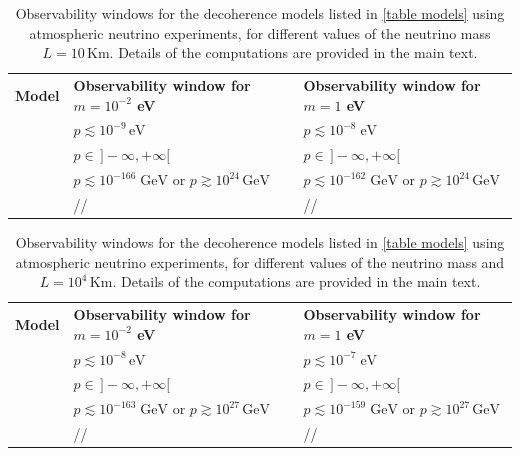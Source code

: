 \documentclass[11pt]{article}
\begin{document}
\begin{table}
    \centering
{\tabulinesep=1.2mm
        \begin{tabu}{|l|l|l|}
       {\small\bf{Model}} & {\footnotesize \bf{Observability window for $m=10^{-2}$ eV}} &{\footnotesize \bf{Observability window for $m=1$ eV}} \\ 
       {\small  \cite{Arzano:2022nlo}} & $p\lesssim 10^{-9}\,\text{eV}$ & $p\lesssim 10^{-8}\; \text{eV}$\\ 
           {\small  \cite{Breuer:2008rh}} &  $p \in\, ]-\infty,+\infty[$  & $p \in \,]-\infty,+\infty[$\\ 
        {\small  \cite{Petruzziello:2020wkd}} & $p\lesssim 10^{-166}\;\text{GeV}$ or $p\gtrsim 10^{24}\,\text{GeV}$ & $p\lesssim 10^{-162}\;\text{GeV}$ or $p\gtrsim 10^{24}\,\text{GeV}$\\ 
        {\small  \cite{Blencowe:2012mp}} &  // & // \\  
        \end{tabu}}
    \caption{Observability windows for the decoherence models listed in \cref{table models} using atmospheric neutrino experiments, for different values of the neutrino mass $L=10\,\text{Km}$. Details of the computations are provided in the main text.}
    \label{windows_atmo_table}
\end{table}


\begin{table}
    \centering
{\tabulinesep=1.2mm
        \begin{tabu}{|l|l|l|}
       {\small\bf{Model}} & {\footnotesize \bf{Observability window for $m=10^{-2}$ eV}} &{\footnotesize \bf{Observability window for $m=1$ eV}} \\ 
       {\small  \cite{Arzano:2022nlo}} & $p\lesssim 10^{-8}\,\text{eV}$ & $p\lesssim 10^{-7}\; \text{eV}$\\ 
           {\small  \cite{Breuer:2008rh}} &  $p \in\, ]-\infty,+\infty[$  & $p \in \,]-\infty,+\infty[$\\ 
        {\small  \cite{Petruzziello:2020wkd}} & $p\lesssim 10^{-163}\;\text{GeV}$ or $p\gtrsim 10^{27}\,\text{GeV}$ & $p\lesssim 10^{-159}\;\text{GeV}$ or $p\gtrsim 10^{27}\,\text{GeV}$\\ 
        {\small  \cite{Blencowe:2012mp}} &  // & // \\  
        \end{tabu}}
    \caption{Observability windows for the decoherence models listed in \cref{table models} using atmospheric neutrino experiments, for different values of the neutrino mass and $L=10^4\,\text{Km}$. Details of the computations are provided in the main text.}
    \label{windows_atmo_table_2}
\end{table}
\end{document}
